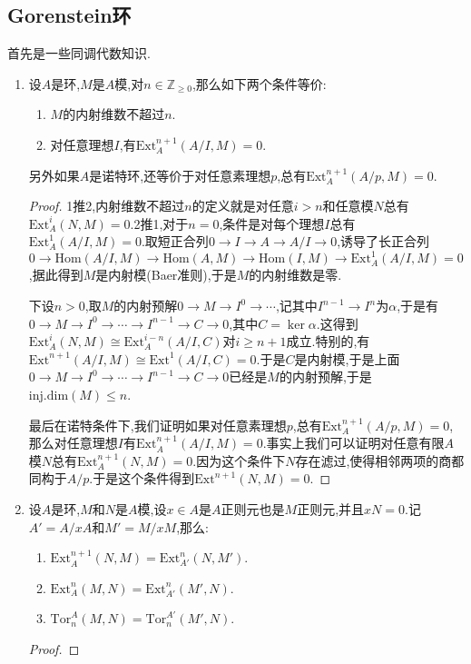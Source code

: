 \subsection{Gorenstein环}

首先是一些同调代数知识.
\begin{enumerate}
	\item 设$A$是环,$M$是$A$模,对$n\in\mathbb{Z}_{\ge0}$,那么如下两个条件等价:
	\begin{enumerate}
		\item $M$的内射维数不超过$n$.
		\item 对任意理想$I$,有$\mathrm{Ext}_A^{n+1}(A/I,M)=0$.
	\end{enumerate}
	
	另外如果$A$是诺特环,还等价于对任意素理想$p$,总有$\mathrm{Ext}_A^{n+1}(A/p,M)=0$.
	\begin{proof}
		
		1推2,内射维数不超过$n$的定义就是对任意$i>n$和任意模$N$总有$\mathrm{Ext}_A^i(N,M)=0$.2推1,对于$n=0$,条件是对每个理想$I$总有$\mathrm{Ext}_A^1(A/I,M)=0$.取短正合列$0\to I\to A\to A/I\to0$,诱导了长正合列$0\to\mathrm{Hom}(A/I,M)\to\mathrm{Hom}(A,M)\to\mathrm{Hom}(I,M)\to\mathrm{Ext}_A^1(A/I,M)=0$,据此得到$M$是内射模(Baer准则),于是$M$的内射维数是零.
		
		下设$n>0$,取$M$的内射预解$0\to M\to I^0\to\cdots$,记其中$I^{n-1}\to I^n$为$\alpha$,于是有$0\to M\to I^0\to\cdots\to I^{n-1}\to C\to0$,其中$C=\ker\alpha$.这得到$\mathrm{Ext}_A^i(N,M)\cong\mathrm{Ext}_A^{i-n}(A/I,C)$对$i\ge n+1$成立.特别的,有$\mathrm{Ext}^{n+1}(A/I,M)\cong\mathrm{Ext}^1(A/I,C)=0$.于是$C$是内射模,于是上面$0\to M\to I^0\to\cdots\to I^{n-1}\to C\to0$已经是$M$的内射预解,于是$\mathrm{inj.dim}(M)\le n$.
		
		最后在诺特条件下,我们证明如果对任意素理想$p$,总有$\mathrm{Ext}_A^{n+1}(A/p,M)=0$,那么对任意理想$I$有$\mathrm{Ext}_A^{n+1}(A/I,M)=0$.事实上我们可以证明对任意有限$A$模$N$总有$\mathrm{Ext}_A^{n+1}(N,M)=0$.因为这个条件下$N$存在滤过,使得相邻两项的商都同构于$A/p$.于是这个条件得到$\mathrm{Ext}^{n+1}(N,M)=0$.
	\end{proof}
	\item 设$A$是环,$M$和$N$是$A$模,设$x\in A$是$A$正则元也是$M$正则元,并且$xN=0$.记$A'=A/xA$和$M'=M/xM$,那么:
	\begin{enumerate}
		\item $\mathrm{Ext}_A^{n+1}(N,M)=\mathrm{Ext}_{A'}^n(N,M')$.
		\item $\mathrm{Ext}_A^n(M,N)=\mathrm{Ext}_{A'}^n(M',N)$.
		\item $\mathrm{Tor}_n^A(M,N)=\mathrm{Tor}_n^{A'}(M',N)$.
	\end{enumerate}
	\begin{proof}
		

\end{proof}
\end{enumerate}
